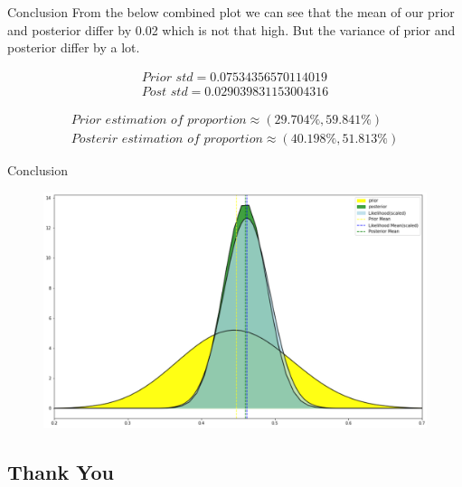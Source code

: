 \documentclass{beamer}
\begin{document}
\begin{frame}{Conclusion}
From the below combined plot we can see that the mean of our prior and posterior differ by 0.02 which is not that high. But the variance of prior and posterior differ by a lot.

        \begin{align*}
        \textit{Prior std} = 0.07534356570114019\\
        \textit{Post std} = 0.029039831153004316
        \end{align*}

        \begin{align*}
        \textit{Prior estimation of proportion} \approx \left (29.704\%, 59.841\% \right )\\
        \textit{Posterir estimation of proportion} \approx \left (40.198\%, 51.813\% \right )
        \end{align*}
\end{frame}
\begin{frame}{Conclusion}
\begin{figure}[htp]
\includegraphics[width=\textwidth]{Images/Final_Comb_Plot.png}
\caption{}
\end{figure}  
\end{frame}
\begin{frame}
\section{Thank You}  
    \begin{center}     \href{https://colab.research.google.com/drive/1AMuKl883Mes_bpji0VLkH9uxfi8i9bwj?usp=sharing}{}
    \end{center}
\end{frame}
\end{document}
